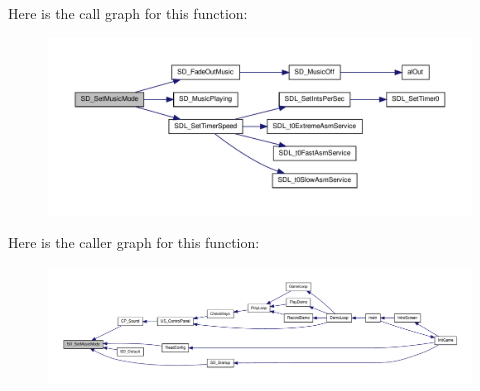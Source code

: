 Here is the call graph for this function:
\nopagebreak
\begin{figure}[H]
\begin{center}
\leavevmode
\includegraphics[width=400pt]{ID__SD_8H_ab12f4ca416e4aa16d877ac310f7a6792_cgraph}
\end{center}
\end{figure}




Here is the caller graph for this function:
\nopagebreak
\begin{figure}[H]
\begin{center}
\leavevmode
\includegraphics[width=400pt]{ID__SD_8H_ab12f4ca416e4aa16d877ac310f7a6792_icgraph}
\end{center}
\end{figure}


